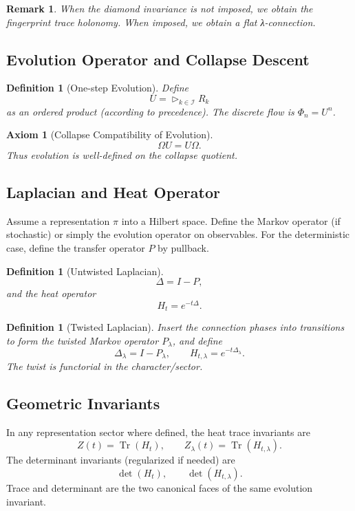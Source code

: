 \documentclass[12pt, oneside]{article}
\newtheorem{definition}[theorem]{Definition}
\newtheorem{axiom}[theorem]{Axiom}
\newtheorem{remark}[theorem]{Remark}
\DeclareMathOperator{\Tr}{Tr}
\begin{document}
\begin{remark}
When the diamond invariance is not imposed, we obtain the fingerprint trace holonomy. When imposed, we obtain a flat λ-connection.
\end{remark}

\subsection{Evolution Operator and Collapse Descent}

\begin{definition}[One-step Evolution]
Define
\[
U = \triangleright_{k \in \mathcal{I}} R_k
\]
as an ordered product (according to precedence). The discrete flow is $\Phi_n = U^n$.
\end{definition}

\begin{axiom}[Collapse Compatibility of Evolution]
\[
\Omega U = U \Omega.
\]
Thus evolution is well-defined on the collapse quotient.
\end{axiom}

\subsection{Laplacian and Heat Operator}

Assume a representation $\pi$ into a Hilbert space. Define the Markov operator (if stochastic) or simply the evolution operator on observables. For the deterministic case, define the transfer operator $P$ by pullback.

\begin{definition}[Untwisted Laplacian]
\[
\Delta = I - P,
\]
and the heat operator
\[
H_t = e^{-t\Delta}.
\]
\end{definition}

\begin{definition}[Twisted Laplacian]
Insert the connection phases into transitions to form the twisted Markov operator $P_\lambda$, and define
\[
\Delta_\lambda = I - P_\lambda, \qquad H_{t,\lambda} = e^{-t\Delta_\lambda}.
\]
The twist is functorial in the character/sector.
\end{definition}

\subsection{Geometric Invariants}

In any representation sector where defined, the heat trace invariants are
\[
Z(t) = \Tr(H_t), \qquad Z_\lambda(t) = \Tr(H_{t,\lambda}).
\]
The determinant invariants (regularized if needed) are
\[
\det(H_t), \qquad \det(H_{t,\lambda}).
\]
Trace and determinant are the two canonical faces of the same evolution invariant.
\end{document}
